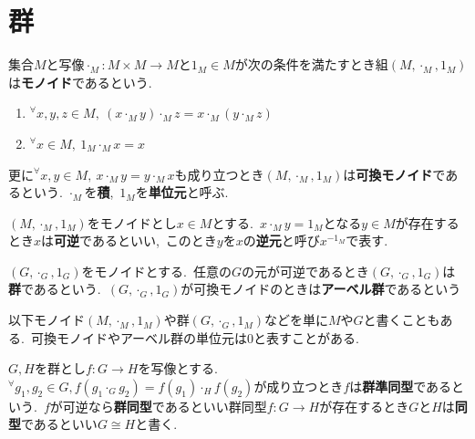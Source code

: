 \section{群}
\begin{definition}
集合$M$と写像$\cdot_M \colon M \times M \to M$と$1_M \in M$が次の条件を満たすとき組$(M, \cdot_M, 1_M)$は\textbf{モノイド}であるという.
\def\labelenumi{(\theenumi)}
\begin{enumerate}
    \item $^{\forall}x,y,z \in M,\ (x \cdot_M y) \cdot_M z = x \cdot_M (y \cdot_M z)$
    \item $^{\forall}x \in M,\ 1_M \cdot_M x = x$
\end{enumerate}
更に$^{\forall}x,y \in M,\ x \cdot_M y = y \cdot_M x$も成り立つとき$(M, \cdot_M, 1_M)$は\textbf{可換モノイド}であるという.
$\cdot_M$を\textbf{積},\ $1_M$を\textbf{単位元}と呼ぶ.
\end{definition}

\begin{definition}
$(M, \cdot_M, 1_M)$をモノイドとし$x \in M$とする.\ $x \cdot_M y = 1_M$となる$y \in M$が存在するとき$x$は\textbf{可逆}であるといい,\ このとき$y$を$x$の\textbf{逆元}と呼び$x^{-1_M}$で表す.
\end{definition}

\begin{definition}
$(G, \cdot_G, 1_G)$をモノイドとする.\ 任意の$G$の元が可逆であるとき$(G, \cdot_G, 1_G)$は\textbf{群}であるという.\ $(G, \cdot_G, 1_G)$が可換モノイドのときは\textbf{アーベル群}であるという
\end{definition}

以下モノイド$(M, \cdot_M, 1_M)$や群$(G, \cdot_G, 1_M)$などを単に$M$や$G$と書くこともある.\ 可換モノイドやアーベル群の単位元は$0$と表すことがある.

\begin{definition}
$G, H$を群とし$f \colon G \to H$を写像とする.\ $^{\forall}g_1, g_2 \in G, f(g_1 \cdot_G g_2) = f(g_1) \cdot_H f(g_2)$が成り立つとき$f$は\textbf{群準同型}であるという.\ $f$が可逆なら\textbf{群同型}であるといい群同型$f \colon G \to H$が存在するとき$G$と$H$は\textbf{同型}であるといい$G \cong H$と書く.
\end{definition}